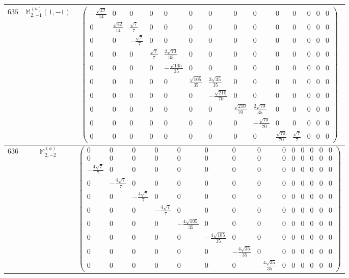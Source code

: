 \documentclass[fleqn,8pt,landscape]{jsarticle}
\begin{document}
\begin{center}
\begin{longtable}{ccc}
$ 635 $ & $ \mathbb{M}_{2,-1}^{(a)}(1,-1) $ & $ \begin{pmatrix} - \frac{\sqrt{42}}{14} & 0 & 0 & 0 & 0 & 0 & 0 & 0 & 0 & 0 & 0 & 0 & 0 & 0 \\ 0 & \frac{\sqrt{42}}{14} & \frac{\sqrt{7}}{7} & 0 & 0 & 0 & 0 & 0 & 0 & 0 & 0 & 0 & 0 & 0 \\ 0 & 0 & - \frac{\sqrt{7}}{7} & 0 & 0 & 0 & 0 & 0 & 0 & 0 & 0 & 0 & 0 & 0 \\ 0 & 0 & 0 & \frac{\sqrt{7}}{7} & \frac{2 \sqrt{70}}{35} & 0 & 0 & 0 & 0 & 0 & 0 & 0 & 0 & 0 \\ 0 & 0 & 0 & 0 & - \frac{\sqrt{105}}{35} & 0 & 0 & 0 & 0 & 0 & 0 & 0 & 0 & 0 \\ 0 & 0 & 0 & 0 & 0 & \frac{\sqrt{105}}{35} & \frac{3 \sqrt{35}}{35} & 0 & 0 & 0 & 0 & 0 & 0 & 0 \\ 0 & 0 & 0 & 0 & 0 & 0 & - \frac{\sqrt{210}}{70} & 0 & 0 & 0 & 0 & 0 & 0 & 0 \\ 0 & 0 & 0 & 0 & 0 & 0 & 0 & \frac{\sqrt{210}}{70} & \frac{2 \sqrt{70}}{35} & 0 & 0 & 0 & 0 & 0 \\ 0 & 0 & 0 & 0 & 0 & 0 & 0 & 0 & - \frac{\sqrt{70}}{70} & 0 & 0 & 0 & 0 & 0 \\ 0 & 0 & 0 & 0 & 0 & 0 & 0 & 0 & 0 & \frac{\sqrt{70}}{70} & \frac{\sqrt{7}}{7} & 0 & 0 & 0 \end{pmatrix} $ \\ \hline
$ 636 $ & $ \mathbb{M}_{2,-2}^{(a)} $ & $ \begin{pmatrix} 0 & 0 & 0 & 0 & 0 & 0 & 0 & 0 & 0 & 0 & 0 & 0 & 0 & 0 \\ 0 & 0 & 0 & 0 & 0 & 0 & 0 & 0 & 0 & 0 & 0 & 0 & 0 & 0 \\ - \frac{4 \sqrt{7}}{7} & 0 & 0 & 0 & 0 & 0 & 0 & 0 & 0 & 0 & 0 & 0 & 0 & 0 \\ 0 & - \frac{4 \sqrt{7}}{7} & 0 & 0 & 0 & 0 & 0 & 0 & 0 & 0 & 0 & 0 & 0 & 0 \\ 0 & 0 & - \frac{4 \sqrt{7}}{7} & 0 & 0 & 0 & 0 & 0 & 0 & 0 & 0 & 0 & 0 & 0 \\ 0 & 0 & 0 & - \frac{4 \sqrt{7}}{7} & 0 & 0 & 0 & 0 & 0 & 0 & 0 & 0 & 0 & 0 \\ 0 & 0 & 0 & 0 & - \frac{4 \sqrt{105}}{35} & 0 & 0 & 0 & 0 & 0 & 0 & 0 & 0 & 0 \\ 0 & 0 & 0 & 0 & 0 & - \frac{4 \sqrt{105}}{35} & 0 & 0 & 0 & 0 & 0 & 0 & 0 & 0 \\ 0 & 0 & 0 & 0 & 0 & 0 & - \frac{4 \sqrt{35}}{35} & 0 & 0 & 0 & 0 & 0 & 0 & 0 \\ 0 & 0 & 0 & 0 & 0 & 0 & 0 & - \frac{4 \sqrt{35}}{35} & 0 & 0 & 0 & 0 & 0 & 0 \end{pmatrix} $ \\ \hline

\end{longtable}
\end{center}
\end{document}
